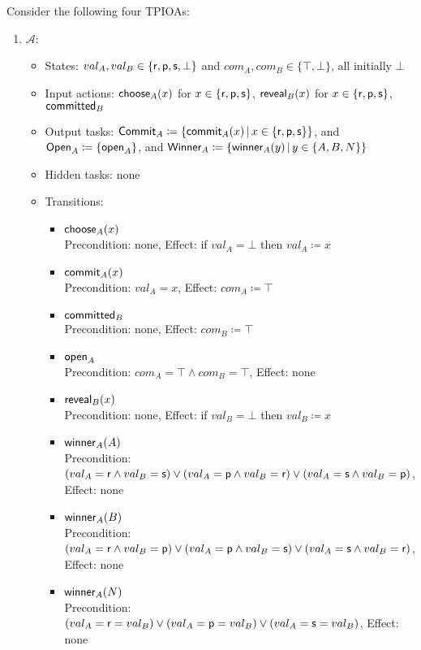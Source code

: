 \documentclass[10pt]{article}
\begin{document}
\begin{example}[$\RPSReal$]
Consider the following four TPIOAs:
\begin{enumerate}

\item $\mathcal{A}$:
\begin{itemize}
\item States: $val_A, val_B \in \{\mathsf{r},\mathsf{p},\mathsf{s},\bot\}$ and $com_A, com_B \in \{\top,\bot\}$, all initially $\bot$
\item Input actions: $\mathsf{choose}_A(x)$ for $x \in \{\mathsf{r},\mathsf{p},\mathsf{s}\}$, $\mathsf{reveal}_B(x)$ for $x \in \{\mathsf{r},\mathsf{p},\mathsf{s}\}$, $\mathsf{committed}_B$
\item Output tasks: $\mathsf{Commit}_A \coloneqq \{\mathsf{commit}_A(x) \, | \, x \in \{\mathsf{r},\mathsf{p},\mathsf{s}\}\}$, and $\mathsf{Open}_A \coloneqq \{\mathsf{open}_A\}$, and $\mathsf{Winner}_A \coloneqq \{\mathsf{winner}_A(y) \, | \, y \in \{A,B,N\}\}$ 
\item Hidden tasks: none
\item Transitions:
\begin{itemize}
\item $\mathsf{choose}_A(x)$ \\
Precondition: none, Effect: if $val_A = \bot$ then $val_A \coloneqq x$
\item $\mathsf{commit}_A(x)$ \\
Precondition: $val_A = x$, Effect: $com_A \coloneqq \top$
\item $\mathsf{committed}_B$ \\
Precondition: none, Effect: $com_B \coloneqq \top$
\item $\mathsf{open}_A$\\
Precondition: $com_A = \top \wedge com_B = \top$, Effect: none
\item $\mathsf{reveal}_B(x)$\\
Precondition: none, Effect: if $val_B = \bot$ then $val_B \coloneqq x$
\item $\mathsf{winner}_A(A)$ \\
Precondition: $(val_A = \mathsf{r} \wedge val_B = \mathsf{s}) \vee (val_A = \mathsf{p} \wedge val_B = \mathsf{r}) \vee (val_A = \mathsf{s} \wedge val_B = \mathsf{p})$, Effect: none
\item $\mathsf{winner}_A(B)$ \\
Precondition: $(val_A = \mathsf{r} \wedge val_B = \mathsf{p}) \vee (val_A = \mathsf{p} \wedge val_B = \mathsf{s}) \vee (val_A = \mathsf{s} \wedge val_B = \mathsf{r})$, Effect: none
\item $\mathsf{winner}_A(N)$ \\
Precondition: $(val_A = \mathsf{r} = val_B) \vee (val_A = \mathsf{p} = val_B) \vee (val_A = \mathsf{s} = val_B)$, Effect: none
\end{itemize}
\end{itemize}


\end{enumerate}
\end{example}
\end{document}

